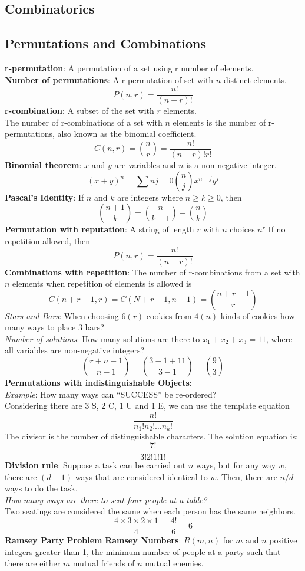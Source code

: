 \documentclass[letter]{article}
\begin{document}
\begin{multicols}{2}
	\section{Combinatorics}
	\subsection{Permutations and Combinations}
	\textbf{r-permutation}: A permutation of a set using r number of
	elements. \\
	\textbf{Number of permutations}: A r-permutation of set with $n$ distinct
	elements.
	$$P(n, r) = \dfrac{n!}{(n - r)!}$$
	\textbf{r-combination}: A subset of the set with $r$ elements. \\
	The number of r-combinations of a set with $n$ elements is the number of
	r-permutations, also known as the binomial coefficient.
	$$C(n, r) = \binom{n}{r} = \dfrac{n!}{(n - r)!r!}$$
	\textbf{Binomial theorem}: $x$ and $y$ are variables and $n$ is a
	non-negative integer. \\
	$${(x + y)}^{n} = \sum{n}{j = 0}\binom{n}{j}x^{n - j}y^{j}$$
	\textbf{Pascal's Identity}: If $n$ and $k$ are integers where
	$n \geq k \geq 0$, then
	$$\binom{n + 1}{k}=\binom{n}{k - 1}+\binom{n}{k}$$
	\textbf{Permutation with reputation}: A string of length $r$ with $n$
	choices $n^r$ If no repetition allowed, then
	$$P(n, r) = \dfrac{n!}{(n - r)!}$$
	\textbf{Combinations with repetition}: The number of r-combinations from a
	set with $n$ elements when repetition of elements is allowed is
	$$C(n + r - 1, r)=C(N + r - 1, n - 1) = \binom{n + r - 1}{r}$$
	\textit{Stars and Bars}: When choosing $6(r)$ cookies from $4(n)$ kinds of
	cookies how many ways to place 3 bars? \\
	\textit{Number of solutions}: How many solutions are there to
	$x_1 + x_2 + x_3 = 11$, where all variables are non-negative integers? \\
	$$$$
	$$\binom{r + n - 1}{n - 1} = \binom{3 - 1 + 11}{3 - 1} = \binom{9}{3}$$
	\textbf{Permutations with indistinguishable Objects}: \\
	\textit{Example}: How many ways can ``SUCCESS'' be re-ordered? \\
	Considering there are 3 S, 2 C, 1 U and 1 E, we can use the template equation
	$$\frac{n!}{n_1!n_2! \ldots n_k!}$$
	The divisor is the number of distinguishable characters. The solution equation
	is:
	$$\frac{7!}{3!2!1!1!}$$
	\textbf{Division rule}: Suppose a task can be carried out $n$ ways, but for
	any way $w$, there are $(d - 1)$ ways that are considered identical to $w$.
	Then, there are $n/d$ ways to do the task. \\
	\textit{How many ways are there to seat four people at a table?} \\
	Two seatings are considered the same when each person has the same neighbors.
	$$\frac{4 \times 3 \times 2 \times 1}{4} = \frac{4!}{6} = 6$$
	\textbf{Ramsey Party Problem}
	\textbf{Ramsey Numbers}: $R(m, n)$ for $m$ and $n$ positive integers greater
	than 1, the minimum number of people at a party such that there are either $m$
	mutual friends of $n$ mutual enemies.

\end{multicols}
\end{document}
